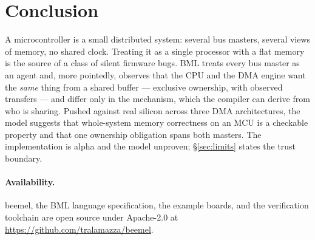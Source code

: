 \documentclass[10pt,twocolumn]{article}
\begin{document}
\section{Conclusion}

A microcontroller is a small distributed system: several bus masters, several
views of memory, no shared clock. Treating it as a single processor with a flat
memory is the source of a class of silent firmware bugs. BML treats every bus
master as an agent and, more pointedly, observes that the CPU and the DMA engine
want the \emph{same} thing from a shared buffer --- exclusive ownership, with
observed transfers --- and differ only in the mechanism, which the compiler can
derive from who is sharing. Pushed against real silicon across three DMA
architectures, the model suggests that whole-system memory correctness on an MCU
is a checkable property and that one ownership obligation spans both masters. The
implementation is alpha and the model unproven; \S\ref{sec:limits} states the
trust boundary.

\paragraph{Availability.} beemel, the BML language specification, the example
boards, and the verification toolchain are open source under Apache-2.0 at
\url{https://github.com/tralamazza/beemel}.
\end{document}
